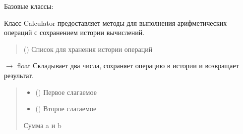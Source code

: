 \documentclass[letterpaper,10pt,russian]{sphinxmanual}
\begin{document}
\begin{fulllineitems}
\label{\detokenize{Calculator:Calculator.Calculator}}
\pysigstartsignatures
\pysigline
{}
\pysigstopsignatures
\sphinxAtStartPar
Базовые классы: 

\sphinxAtStartPar
Класс Calculator предоставляет методы для выполнения арифметических операций
с сохранением истории вычислений.
\begin{quote}\begin{description}
\sphinxAtStartPar
{} (\sphinxstyleliteralemphasis{\sphinxupquote{{[}}}\sphinxstyleliteralemphasis{\sphinxupquote{{]}}}) \textendash{} Список для хранения истории операций

\end{description}\end{quote}

\begin{fulllineitems}
\label{\detokenize{Calculator:Calculator.Calculator.add}}
\pysigstartsignatures
\pysiglinewithargsret
{}
{\sphinxparamcomma {}}
{{ $\rightarrow$ float}}
\pysigstopsignatures
\sphinxAtStartPar
Складывает два числа, сохраняет операцию в истории и возвращает результат.
\begin{quote}\begin{description}
\begin{itemize}
\item {} 
\sphinxAtStartPar
{} () \textendash{} Первое слагаемое

\item {} 
\sphinxAtStartPar
{} () \textendash{} Второе слагаемое

\end{itemize}

\sphinxAtStartPar
Сумма a и b


\end{description}
\end{quote}
\end{fulllineitems}
\end{fulllineitems}
\end{document}
